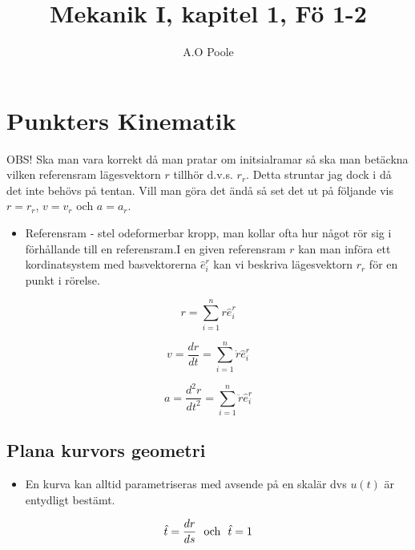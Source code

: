 \documentclass[a4paper,12pt]{article}
\title{Mekanik I, kapitel 1, Fö 1-2}
\author{A.O Poole}
\begin{document}
\section{Punkters Kinematik}


OBS! Ska man vara korrekt då man pratar om initsialramar så ska man betäckna vilken
referensram lägesvektorn $r$ tillhör d.v.s. $r_r$. Detta struntar jag dock i då det
inte behövs på tentan. Vill man göra det ändå så set det ut på följande vis 
$r = r_r$, $v = v_r$ och $a = a_r$.

\begin{itemize}
  \item Referensram - stel odeformerbar kropp, man kollar ofta hur något rör sig i 
  förhållande till en referensram.I en given referensram $r$ kan man införa ett 
  kordinatsystem med basvektorerna $\hat{e}^r_i$ kan vi beskriva lägesvektorn 
  $r_r$ för en punkt i rörelse.

\end{itemize}

\begin{equation}
 r = \sum\limits_{i=1}^n r\hat{e}^r_i 
\end{equation}

\begin{equation}
v = \frac{dr}{dt} = \sum\limits_{i=1}^n \dot{r}\hat{e}^r_i 
\end{equation}

\begin{equation}
a = \frac{d^2r}{dt^2} = \sum\limits_{i=1}^n \ddot{r}\hat{e}^r_i 
\end{equation}


\subsection{Plana kurvors geometri}

\begin{itemize}
  \item En kurva kan alltid parametriseras med avsende på en skalär dvs $u(t)$
        är entydligt bestämt.
\end{itemize}

\begin{equation}
\hat{t} = \frac{dr}{ds}$ \text{ och } $\hat{t}=1
\end{equation}
\end{document}
